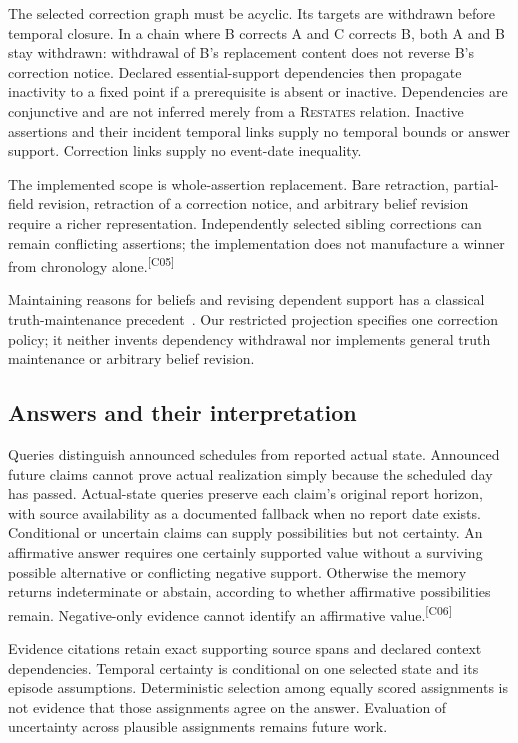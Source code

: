 \documentclass[10pt,letterpaper]{article}
\newcommand{\claim}[1]{\textsuperscript{\scriptsize[#1]}}
\begin{document}
The selected correction graph must be acyclic. Its targets are withdrawn before
temporal closure. In a chain where B corrects A and C corrects B, both A and B
stay withdrawn: withdrawal of B's replacement content does not reverse B's
correction notice. Declared essential-support dependencies then propagate
inactivity to a fixed point if a prerequisite is absent or inactive. Dependencies
are conjunctive and are not inferred merely from a \textsc{Restates} relation.
Inactive assertions and their incident temporal links supply no temporal bounds
or answer support. Correction links supply no event-date inequality.

The implemented scope is whole-assertion replacement. Bare retraction,
partial-field revision, retraction of a correction notice, and arbitrary
belief revision require a richer representation. Independently selected sibling
corrections can remain conflicting assertions; the implementation does not
manufacture a winner from chronology alone.\claim{C05}

Maintaining reasons for beliefs and revising dependent support has a classical
truth-maintenance precedent~\cite{doyle1979truth}. Our restricted projection
specifies one correction policy; it neither invents dependency withdrawal nor
implements general truth maintenance or arbitrary belief revision.

\subsection{Answers and their interpretation}
\label{sec:answers}
Queries distinguish announced schedules from reported actual state. Announced
future claims cannot prove actual realization simply because the scheduled day
has passed. Actual-state queries preserve each claim's original report horizon,
with source availability as a documented fallback when no report date exists.
Conditional or uncertain claims can supply possibilities but not certainty.
An affirmative answer requires one certainly supported value without a surviving
possible alternative or conflicting negative support. Otherwise the memory
returns indeterminate or abstain, according to whether affirmative possibilities
remain. Negative-only evidence cannot identify an affirmative value.\claim{C06}

Evidence citations retain exact supporting source spans and declared context
dependencies. Temporal certainty is conditional on one selected state and its
episode assumptions. Deterministic selection among equally scored assignments
is not evidence that those assignments agree on the answer. Evaluation of
uncertainty across plausible assignments remains future work.
\end{document}
